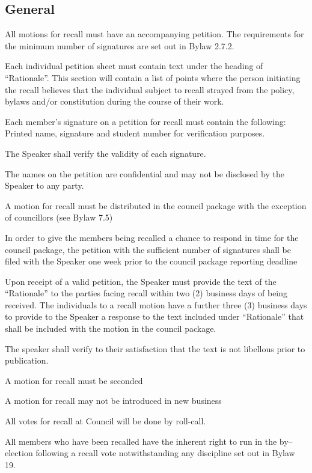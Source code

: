 \subsection{General}
\begin{longenum}[ label*=\thesubsection.\arabic*., align=left]
	\item  All motions for recall must have an accompanying petition. The requirements for the minimum number of signatures are set out in Bylaw 2.7.2.
	\begin{longenum}[ label*=\arabic*., align=left]
		\item Each individual petition sheet must contain text under the heading of ``Rationale''.  This section will contain a list of points where the person initiating the recall believes that the individual subject to recall strayed from the policy, bylaws and/or constitution during the course of their work.
        \item Each member's signature on a petition for recall must contain the following: Printed name, signature and student number for verification purposes.
        \item The Speaker shall verify the validity of each signature.
        \item The names on the petition are confidential and may not be disclosed by the Speaker to any party.
    \end{longenum}
    \item A motion for recall must be distributed in the council package with the exception of councillors (see Bylaw 7.5)
    \item In order to give the members being recalled a chance to respond in time for the council package, the petition with the sufficient number of signatures shall be filed with the Speaker one week prior to the council package reporting deadline
    \item Upon receipt of a valid petition, the Speaker must provide the text of the ``Rationale'' to the parties facing recall within two (2) business days of being received. The individuals to a recall motion have a further three (3) business days to provide to the Speaker a response to the text included under ``Rationale'' that shall be included with the motion in the council package.
    \item The speaker shall verify to their satisfaction that the text is not libellous prior to publication.
    \item A motion for recall must be seconded
    \item A motion for recall may not be introduced in new business
    \item All votes for recall at Council will be done by roll-call.
    \item All members who have been recalled have the inherent right to run in the by--election following a recall vote notwithstanding any discipline set out in Bylaw 19.
\end{longenum}

